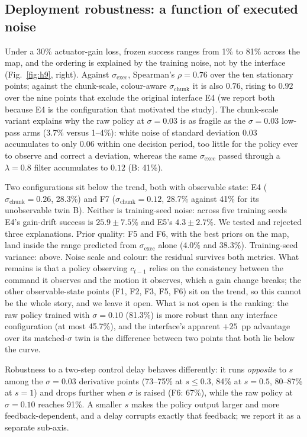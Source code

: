 \documentclass[conference]{IEEEtran}
\newcommand{\sexec}{\sigma_{\mathrm{exec}}}
\newcommand{\schunk}{\sigma_{\mathrm{chunk}}}
\begin{document}
\subsection{Deployment robustness: a function of executed noise}
\label{sec:robust}

Under a 30\% actuator-gain loss, frozen success ranges from 1\% to 81\% across the map, and the ordering is explained by the training noise, not by the interface (Fig.~\ref{fig:h9}, right). Against $\sexec$, Spearman's $\rho=0.76$ over the ten stationary points; against the chunk-scale, colour-aware $\schunk$ it is also $0.76$, rising to $0.92$ over the nine points that exclude the original interface E4 (we report both because E4 is the configuration that motivated the study). The chunk-scale variant explains why the raw policy at $\sigma=0.03$ is as fragile as the $\sigma=0.03$ low-pass arms (3.7\% versus 1--4\%): white noise of standard deviation 0.03 accumulates to only $0.06$ within one decision period, too little for the policy ever to observe and correct a deviation, whereas the same $\sexec$ passed through a $\lambda=0.8$ filter accumulates to $0.12$ (B: 41\%).

Two configurations sit below the trend, both with observable state: E4 ($\schunk=0.26$, 28.3\%) and F7 ($\schunk=0.12$, 28.7\% against 41\% for its unobservable twin B). Neither is training-seed noise: across five training seeds E4's gain-drift success is $25.9\pm7.5\%$ and E5's $4.3\pm2.7\%$. We tested and rejected three explanations. Prior quality: F5 and F6, with the best priors on the map, land inside the range predicted from $\sexec$ alone (4.0\% and 38.3\%). Training-seed variance: above. Noise scale and colour: the residual survives both metrics. What remains is that a policy observing $c_{t-1}$ relies on the consistency between the command it observes and the motion it observes, which a gain change breaks; the other observable-state points (F1, F2, F3, F5, F6) sit on the trend, so this cannot be the whole story, and we leave it open. What is not open is the ranking: the raw policy trained with $\sigma=0.10$ (81.3\%) is more robust than any interface configuration (at most 45.7\%), and the interface's apparent $+25$~pp advantage over its matched-$\sigma$ twin is the difference between two points that both lie below the curve.

Robustness to a two-step control delay behaves differently: it runs \emph{opposite} to $s$ among the $\sigma=0.03$ derivative points (73--75\% at $s\le0.3$, 84\% at $s=0.5$, 80--87\% at $s=1$) and drops further when $\sigma$ is raised (F6: 67\%), while the raw policy at $\sigma=0.10$ reaches 91\%. A smaller $s$ makes the policy output larger and more feedback-dependent, and a delay corrupts exactly that feedback; we report it as a separate sub-axis.
\end{document}
